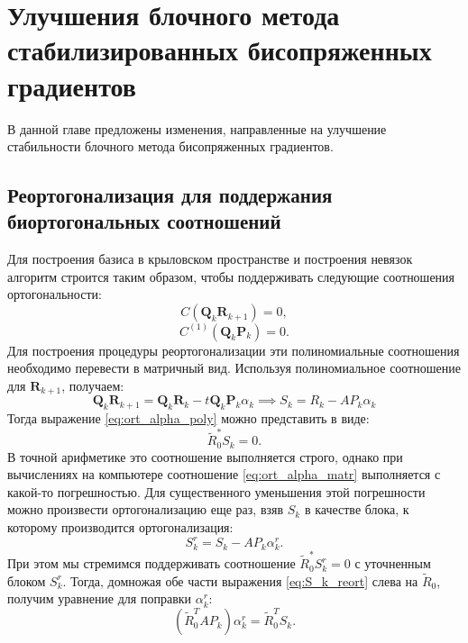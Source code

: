     \section{{\color{red}Улучшения} блочного метода стабилизированных бисопряженных градиентов}
\label{sec:Chapter3} 
В данной главе предложены изменения, направленные на улучшение стабильности блочного метода 
бисопряженных градиентов. 
\subsection{Реортогонализация для поддержания биортогональных соотношений}
Для построения базиса в крыловском пространстве и построения невязок алгоритм 
строится таким образом, чтобы поддерживать следующие соотношения ортогональности:
\begin{equation}
    \label{eq:ort_alpha_poly}
    C(\mathbf{Q}_{k} \mathbf{R}_{k+1}) = 0,
\end{equation}
\begin{equation}
    \label{eq:ort_beta_poly}
    C^{(1)}(\mathbf{Q}_{k} \mathbf{P}_k) = 0. 
\end{equation}
Для построения процедуры реортогонализации эти полиномиальные соотношения необходимо 
перевести в матричный вид.
Используя полиномиальное соотношение для $\mathbf{R}_{k+1}$, получаем:
$$\mathbf{Q}_{k}\mathbf{R}_{k+1} = \mathbf{Q}_{k}\mathbf{R}_{k} - t\mathbf{Q}_{k}\mathbf{P}_{k}\alpha_k \implies S_k = R_k - AP_k\alpha_k $$
Тогда выражение \eqref{eq:ort_alpha_poly} можно представить в виде:
\begin{equation}
    \label{eq:ort_alpha_matr}
    \tilde{R}_0^* S_k = 0.
\end{equation}
В точной арифметике это соотношение выполняется строго, однако при вычислениях на компьютере 
соотношение \eqref{eq:ort_alpha_matr} выполняется с какой-то погрешностью. Для существенного уменьшения 
этой погрешности можно произвести ортогонализацию еще раз, взяв $S_k$ в качестве блока, к которому производится
ортогонализация:
\begin{equation}
    \label{eq:S_k_reort}
    S_k^{r} = S_k - AP_k\alpha_k^r.
\end{equation}
При этом мы стремимся поддерживать соотношение $\tilde{R}_0^*S_k^r=0$ с уточненным блоком $S_k^r$.
Тогда, домножая обе части выражения \eqref{eq:S_k_reort} слева на $\tilde{R}_0$, получим уравнение для 
поправки $\alpha_k^r$:
\begin{equation*}
    (\tilde{R}_0^TAP_k)\alpha_k^r = \tilde{R}_0^TS_k.
\end{equation*}

